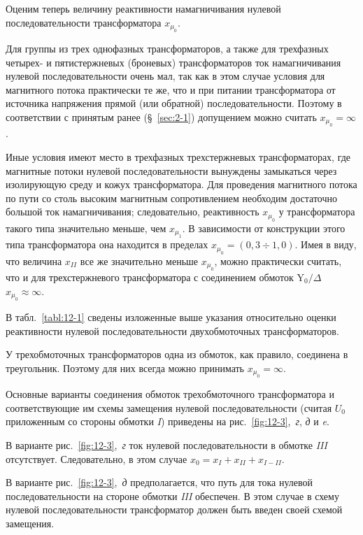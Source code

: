 Оценим теперь величину реактивности намагничивания нулевой последовательности трансформатора $ x_{\mu_0} $.

Для группы из трех однофазных трансформаторов, а также для трехфазных четырех- и пятистержневых (броневых) трансформаторов ток намагничивания нулевой последовательности очень мал, так как в этом случае условия для магнитного потока практически те же, что и при питании трансформатора от источника напряжения прямой (или обратной) последовательности. Поэтому в соответствии с принятым ранее (§~\ref{sec:2-1}) допущением можно считать $ x_{\mu_0} = \infty $.

Иные условия имеют место в трехфазных трехстержневых трансформаторах, где магнитные потоки нулевой последовательности вынуждены замыкаться через изолирующую среду и кожух трансформатора. Для проведения магнитного потока по пути со столь высоким магнитным сопротивлением необходим достаточно большой ток намагничивания; следовательно, реактивность $ x_{\mu_0} $ у трансформатора такого типа значительно меньше, чем $ x_{\mu_1} $. В зависимости от конструкции этого типа трансформатора она находится в пределах $ x_{\mu_0} = (0,3 \div 1,0 ) $. Имея в виду, что величина $ x_{II} $ все же значительно меньше $ x_{\mu_0} $, можно практически считать, что и для трехстержневого трансформатора с соединением обмоток $ \text{Y}_0 / \Delta $ ~~ $ x_{\mu_0} \approx \infty $.

В табл.~\ref{tabl:12-1} сведены изложенные выше указания относительно оценки реактивности нулевой последовательности двухобмоточных трансформаторов.


У трехобмоточных трансформаторов одна из обмоток, как правило, соединена в треугольник. Поэтому для них всегда можно принимать $ x_{\mu_0} = \infty $.

Основные варианты соединения обмоток трехобмоточного трансформатора и соответствующие им схемы замещения нулевой последовательности (считая $ U_0 $ приложенным со стороны обмотки \textit{I}) приведены на рис.~\ref{fig:12-3},~\textit{г}, \textit{д} и \textit{e}.

В варианте рис.~\ref{fig:12-3},~\textit{г} ток нулевой последовательности в обмотке \textit{III} отсутствует. Следовательно, в этом случае $ x_0 = x_I + x_{II} + x_{I-II} $.

В варианте рис.~\ref{fig:12-3},~\textit{д} предполагается, что путь для тока нулевой последовательности на стороне обмотки \textit{III} обеспечен. В этом случае в схему нулевой последовательности трансформатор должен быть введен своей схемой замещения.

